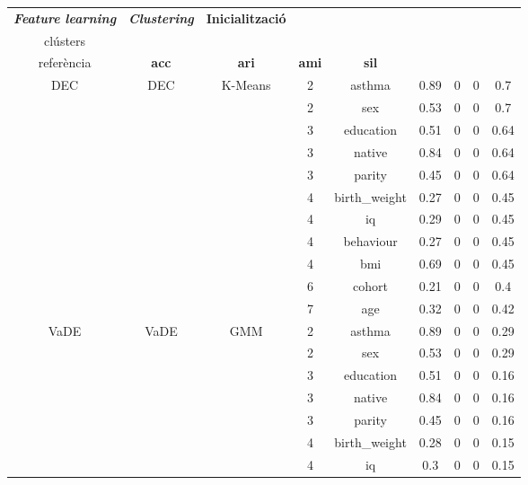 \documentclass[CAT,BIB]{TFUOC}%
\begin{document}
    \newpage
    \scriptsize
    \begin{center}
        \begin{longtable}{@{}ccccccccc@{}}
            \toprule
            \textit{\textbf{Feature learning}} & \textit{\textbf{Clustering}} & \textbf{Inicialització} & \textbf{\begin{tabular}[c]{@{}l@{}}Núm.\\ clústers\end{tabular}} & \textbf{\begin{tabular}[c]{@{}l@{}}Covariable\\ referència\end{tabular}} & \textbf{\gls{acc}} & \textbf{\gls{ari}} & \textbf{\gls{ami}} & \textbf{\gls{sil}} \\ \hline
            \multirow{11}{*}{DEC} & \multirow{11}{*}{DEC} & \multirow{11}{*}{K-Means} & 2 & asthma & 0.89 & 0 & 0 & 0.7 \\
            &  &  & 2 & sex & 0.53 & 0 & 0 & 0.7 \\
            &  &  & 3 & education & 0.51 & 0 & 0 & 0.64 \\
            &  &  & 3 & native & 0.84 & 0 & 0 & 0.64 \\
            &  &  & 3 & parity & 0.45 & 0 & 0 & 0.64 \\
            &  &  & 4 & birth\_weight & 0.27 & 0 & 0 & 0.45 \\
            &  &  & 4 & iq & 0.29 & 0 & 0 & 0.45 \\
            &  &  & 4 & behaviour & 0.27 & 0 & 0 & 0.45 \\
            &  &  & 4 & bmi & 0.69 & 0 & 0 & 0.45 \\
            &  &  & 6 & cohort & 0.21 & 0 & 0 & 0.4 \\
            &  &  & 7 & age & 0.32 & 0 & 0 & 0.42 \\ \midrule
            \multirow{11}{*}{VaDE} & \multirow{11}{*}{VaDE} & \multirow{11}{*}{GMM} & 2 & asthma & 0.89 & 0 & 0 & 0.29 \\
            &  &  & 2 & sex & 0.53 & 0 & 0 & 0.29 \\
            &  &  & 3 & education & 0.51 & 0 & 0 & 0.16 \\
            &  &  & 3 & native & 0.84 & 0 & 0 & 0.16 \\
            &  &  & 3 & parity & 0.45 & 0 & 0 & 0.16 \\
            &  &  & 4 & birth\_weight & 0.28 & 0 & 0 & 0.15 \\
            &  &  & 4 & iq & 0.3 & 0 & 0 & 0.15 \\

\end{longtable}
\end{center}
\end{document}

